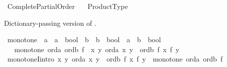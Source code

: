 %
\begin{isabellebody}%
%
%
\isadelimdocument
%
\endisadelimdocument
%
\isatagdocument
%
\isamarkuptrue%
%
\endisatagdocument
{\isafolddocument}%
%
\isadelimdocument
%
\endisadelimdocument
%
\isadelimtheory
%
\endisadelimtheory
%
\isatagtheory
{}\isamarkupfalse%
\ Complete{\isacharunderscore}{\kern0pt}Partial{\isacharunderscore}{\kern0pt}Order\isanewline
\ \ \ Product{\isacharunderscore}{\kern0pt}Type\isanewline
{}%
\endisatagtheory
{\isafoldtheory}%
%
\isadelimtheory
%
\endisadelimtheory
%
\isadelimdocument
%
\endisadelimdocument
%
\isatagdocument
%
\isamarkuptrue%
%
\endisatagdocument
{\isafolddocument}%
%
\isadelimdocument
%
\endisadelimdocument
%
\begin{isamarkuptext}%
Dictionary-passing version of .%
\end{isamarkuptext}\isamarkuptrue%
\isamarkupfalse%
\ monotone\ {\isacharcolon}{\kern0pt}{\isacharcolon}{\kern0pt}\ {\isachardoublequoteopen}{\isacharparenleft}{\kern0pt}{\isacharprime}{\kern0pt}a\ {\isasymRightarrow}\ {\isacharprime}{\kern0pt}a\ {\isasymRightarrow}\ bool{\isacharparenright}{\kern0pt}\ {\isasymRightarrow}\ {\isacharparenleft}{\kern0pt}{\isacharprime}{\kern0pt}b\ {\isasymRightarrow}\ {\isacharprime}{\kern0pt}b\ {\isasymRightarrow}\ bool{\isacharparenright}{\kern0pt}\ {\isasymRightarrow}\ {\isacharparenleft}{\kern0pt}{\isacharprime}{\kern0pt}a\ {\isasymRightarrow}\ {\isacharprime}{\kern0pt}b{\isacharparenright}{\kern0pt}\ {\isasymRightarrow}\ bool{\isachardoublequoteclose}\isanewline
\ \ \ {\isachardoublequoteopen}monotone\ orda\ ordb\ f\ {\isasymlongleftrightarrow}\ {\isacharparenleft}{\kern0pt}{\isasymforall}x\ y{\isachardot}{\kern0pt}\ orda\ x\ y\ {\isasymlongrightarrow}\ ordb\ {\isacharparenleft}{\kern0pt}f\ x{\isacharparenright}{\kern0pt}\ {\isacharparenleft}{\kern0pt}f\ y{\isacharparenright}{\kern0pt}{\isacharparenright}{\kern0pt}{\isachardoublequoteclose}\isanewline
\isanewline
{}\isamarkupfalse%
\ monotoneI{\isacharbrackleft}{\kern0pt}intro{\isacharquery}{\kern0pt}{\isacharbrackright}{\kern0pt}{\isacharcolon}{\kern0pt}\ {\isachardoublequoteopen}{\isacharparenleft}{\kern0pt}{\isasymAnd}x\ y{\isachardot}{\kern0pt}\ orda\ x\ y\ {\isasymLongrightarrow}\ ordb\ {\isacharparenleft}{\kern0pt}f\ x{\isacharparenright}{\kern0pt}\ {\isacharparenleft}{\kern0pt}f\ y{\isacharparenright}{\kern0pt}{\isacharparenright}{\kern0pt}\ {\isasymLongrightarrow}\ monotone\ orda\ ordb\ f{\isachardoublequoteclose}\isanewline

\end{isabellebody}
